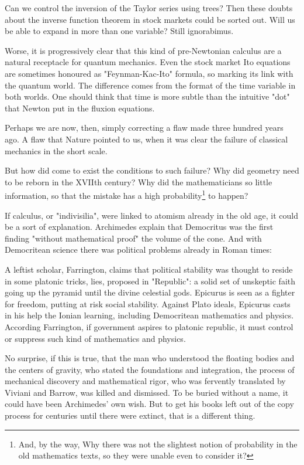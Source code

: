 \documentclass[a4paper,10pt]{article}
\begin{document}
Can we control the inversion of the Taylor series using trees? Then
these doubts about the inverse function theorem in stock markets
could be sorted out. Will us be able to expand in more than
one variable? Still ignorabimus.

Worse, it is progressively clear that this kind of pre-Newtonian
calculus are a natural receptacle for quantum mechanics. Even the
stock market Ito equations are sometimes honoured as "Feynman-Kac-Ito"
formula, so marking its link with the quantum world. The difference
comes from the format of the time variable in both worlds. One should
think that time is more subtle than the intuitive "dot" that 
Newton put in the fluxion equations.

Perhaps we are now, then, simply correcting a flaw made three hundred
years ago. A flaw that Nature pointed to us, when it was clear the
failure of classical mechanics in the short scale.

But how did come to exist the conditions to such failure? Why did
geometry need to be reborn in the XVIIth century? Why did
the mathematicians so little information, so that the mistake has
a high probability\footnote{And, by the way, Why there was not the
slightest notion of probability in the old mathematics texts, so
they were unable even to consider it?} to happen?

If calculus, or "indivisilia", were linked to atomism already in the
old age, it could be a sort of explanation. Archimedes explain that
Democritus was the first finding "without mathematical proof" the volume
of the cone. And with Democritean science there was political problems
already in Roman times:

A leftist scholar, Farrington\cite{farrington}, claims
 that political stability was thought
to reside in some platonic tricks, lies, proposed
in "Republic": a solid set of unskeptic faith going up
the pyramid until the divine celestial gods.  Epicurus is seen
as a fighter for freedom, putting at risk social stability. Against
Plato ideals, Epicurus casts in his help the Ionian learning,
including Democritean mathematics and physics. According Farrington,
if government aspires to platonic republic, it must control or
suppress such kind of mathematics and physics. 

No surprise, if this is true, that the man who understood the floating
bodies and the centers of gravity, who stated the foundations
and integration, the process of mechanical discovery and mathematical
rigor, who was fervently translated by Viviani and Barrow, was killed
and dismissed. To be buried without a name, it could have been Archimedes'
own wish. But to get his books left out of the copy process for centuries
until there were extinct, that is a different thing.
\end{document}
